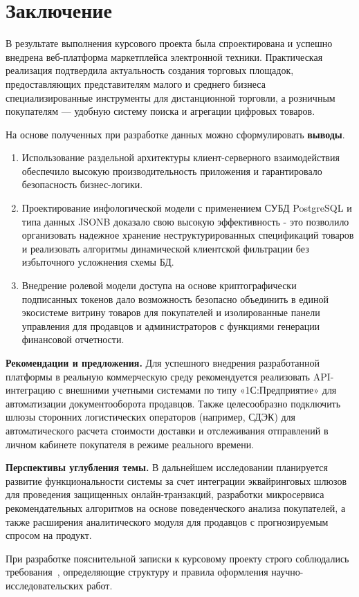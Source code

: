 \section*{Заключение}

В результате выполнения курсового проекта была спроектирована и успешно внедрена веб-платформа маркетплейса электронной техники. Практическая 
реализация подтвердила актуальность создания торговых площадок, предоставляющих представителям малого и среднего бизнеса специализированные инструменты 
для дистанционной торговли, а розничным покупателям — удобную систему поиска и агрегации цифровых товаров.

На основе полученных при разработке данных можно сформулировать \textbf{выводы}.

\begin{enumerate}
    \item Использование раздельной архитектуры клиент-серверного взаимодействия обеспечило высокую производительность приложения и гарантировало безопасность бизнес-логики.
    \item Проектирование инфологической модели с применением СУБД PostgreSQL и типа данных JSONB доказало свою высокую эффективность - это позволило организовать 
	надежное хранение неструктурированных спецификаций товаров и реализовать алгоритмы динамической клиентской фильтрации без избыточного усложнения схемы БД.
    \item Внедрение ролевой модели доступа на основе криптографически подписанных токенов дало возможность безопасно объединить в единой экосистеме витрину товаров для покупателей 
	и изолированные панели управления для продавцов и администраторов с функциями генерации финансовой отчетности.
\end{enumerate}

\textbf{Рекомендации и предложения.} Для успешного внедрения разработанной платформы в реальную коммерческую среду рекомендуется реализовать API-интеграцию с внешними учетными 
системами по типу «1С:Предприятие» для автоматизации документооборота продавцов. Также целесообразно подключить шлюзы сторонних логистических операторов (например, СДЭК) для 
автоматического расчета стоимости доставки и отслеживания отправлений в личном кабинете покупателя в режиме реального времени.

\textbf{Перспективы углубления темы.} В дальнейшем исследовании планируется развитие функциональности системы за счет интеграции 
эквайринговых шлюзов для проведения защищенных онлайн-транзакций, разработки микросервиса рекомендательных алгоритмов на основе поведенческого анализа покупателей, а также 
расширения аналитического модуля для продавцов с прогнозируемым спросом на продукт.

При разработке пояснительной записки к курсовому проекту строго соблюдались требования~\cite{gost_report}, определяющие структуру и правила оформления 
научно-исследовательских работ.

